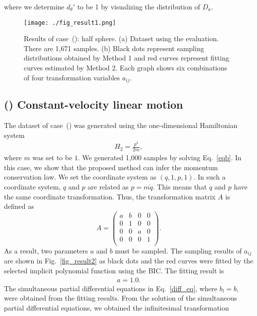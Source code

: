 \documentclass[preprint,
bibnotes,
 amsmath,amssymb,
 aps,
]{revtex4-1}
\newcounter{num}
\newcommand{\rnum}[1]{\setcounter{num}{#1}\roman{num}}
\begin{document}
where we determine $d_{\theta}'$ to be 1 by visualizing the distribution of $D_a$. 
\begin{figure}[htbp]
  \begin{center}
   \texttt{[image: ./fig\_result1.png]}
  \caption{Results of case~(\rnum{1}): half sphere. (a) Dataset using the evaluation. There are 1,671 samples. 
(b) Black dots represent sampling distributions obtained by Method 1 and red curves represent fitting curves estimated by Method 2. Each graph shows six combinations of four transformation variables $a_{ij}$.}
  \label{fig_result1}
  \end{center}
\end{figure}

\subsection*{(\rnum{2}) Constant-velocity linear motion}
The dataset of case~(\rnum{2}) was generated using the one-dimensional Hamiltonian system 
\begin{eqnarray}
\label{eqb}
H_2 = \frac{p^2}{2m},
\end{eqnarray}
where $m$ was set to be $1$. We generated 1,000 samples by solving Eq.~\eqref{eqb}. 
In this case, we show that the proposed method can infer the momentum conservation law. 
We set the coordinate system as $(q,1,p,1)$. 
In such a coordinate system, $q$ and $p$ are related as $p = m\dot{q}$. This means that $q$ and $p$ have the same coordinate transformation. Thus, the transformation matrix $A$ is defined as
\begin{equation}
\label{sampab}
A =\left(
    \begin{array}{cccc}
      a & b & 0 & 0\\
      0 & 1 & 0 & 0\\
      0 & 0 & a & 0\\
      0 & 0 & 0 & 1\\
    \end{array}
  \right).
\end{equation}
As a result, two parameters $a$ and $b$ must be sampled. 
The sampling results of $a_{ij}$ are shown in Fig.~\ref{fig_result2} as black dots and the red curves were fitted by the selected implicit polynomial function using the BIC. 
The fitting result is  
\begin{eqnarray}
a=1.0.
\end{eqnarray}
The simultaneous partial differential equations in Eq.~\eqref{diff_eq}, where $b_l = b$, were obtained from the fitting results. From the solution of the simultaneous partial differential equations, we obtained the infinitesimal transformation
\end{document}
